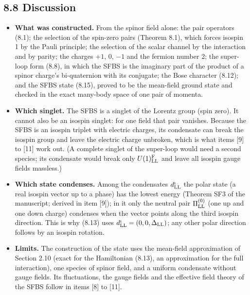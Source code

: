 \documentclass[
  10pt,
]{article}
\providecommand{\tightlist}{%
  \setlength{\itemsep}{0pt}\setlength{\parskip}{0pt}}
\begin{document}
\hypertarget{discussion-6}{%
\subsection{8.8 Discussion}\label{discussion-6}}

\begin{itemize}
\tightlist
\item
  \textbf{What was constructed.} From the spinor field alone: the pair
  operators (8.1); the selection of the spin-zero pairs (Theorem 8.1),
  which forces isospin 1 by the Pauli principle; the selection of the
  scalar channel by the interaction and by parity; the charges \(+1\),
  \(0\), \(-1\) and the fermion number 2; the super-loop form (8.8), in
  which the SFBS is the imaginary part of the product of a spinor
  charge's bi-quaternion with its conjugate; the Bose character (8.12);
  and the SFBS state (8.15), proved to be the mean-field ground state
  and checked in the exact many-body space of one pair of momenta.
\item
  \textbf{Which singlet.} The SFBS is a singlet of the Lorentz group
  (spin zero). It cannot also be an isospin singlet: for one field that
  pair vanishes. Because the SFBS is an isospin triplet with electric
  charges, its condensate can break the isospin group and leave the
  electric charge unbroken, which is what items {[}9{]} to {[}11{]} work
  out. (A complete singlet of the super-loop would need a second
  species; its condensate would break only \(U(1)^{\rm F}_{\rm LL}\) and
  leave all isospin gauge fields massless.)
\item
  \textbf{Which state condenses.} Among the condensates
  \(d^\iota_{\rm LL}\) the polar state (a real isospin vector up to a
  phase) has the lowest energy (Theorem SF3 of the manuscript; derived
  in item {[}9{]}); in it only the neutral pair \(\Pi^{(0)}_{\rm LL}\)
  (one up and one down charge) condenses when the vector points along
  the third isospin direction. This is why (8.13) uses
  \(d^\iota_{\rm LL}=(0,0,\Delta_{\rm LL})\); any other polar direction
  follows by an isospin rotation.
\item
  \textbf{Limits.} The construction of the state uses the mean-field
  approximation of Section 2.10 (exact for the Hamiltonian (8.13), an
  approximation for the full interaction), one species of spinor field,
  and a uniform condensate without gauge fields. Its fluctuations, the
  gauge fields and the effective field theory of the SFBS follow in
  items {[}8{]} to {[}11{]}.
\end{itemize}
\end{document}
